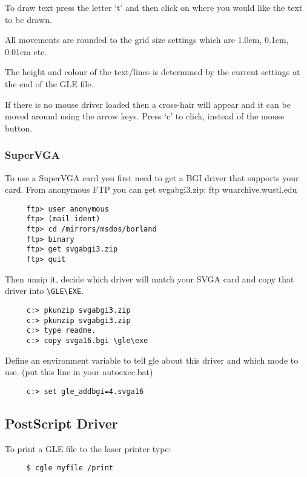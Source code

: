 To draw text press the letter `t' and then click on where you would
like the text to be drawn.  

All movements are rounded to the grid size settings which are 
1.0cm, 0.1cm, 0.01cm etc.  

The height and colour of the text/lines is determined by the current
settings at the end of the GLE file.

If there is no mouse driver loaded then a cross-hair will appear 
and it can be moved around using the arrow keys.  Press `c' to 
click, instead of the mouse button.
\subsubsection{SuperVGA}
%
To use a SuperVGA card you first need to get a BGI
driver that supports your card.  From anonymous FTP
you can get svgabgi3.zip: ftp wuarchive.wustl.edu
\begin{verbatim}
     ftp> user anonymous
     ftp> (mail ident)
     ftp> cd /mirrors/msdos/borland
     ftp> binary
     ftp> get svgabgi3.zip
     ftp> quit
\end{verbatim}
Then unzip it, decide which driver will match your SVGA card
and copy that driver into \verb?\GLE\EXE?.
\begin{verbatim}
     c:> pkunzip svgabgi3.zip
     c:> pkunzip svgabgi3.zip
     c:> type readme. 
     c:> copy svga16.bgi \gle\exe
\end{verbatim}
Define an environment variable to tell gle about this driver
and which mode to use. (put this line in your autoexec.bat)
\begin{verbatim} 
     c:> set gle_addbgi=4.svga16
\end{verbatim}                                                                                      


%
\subsection{PostScript Driver}
To print a GLE file to the laser printer type:
\begin{verbatim}
     $ cgle myfile /print
\end{verbatim}

